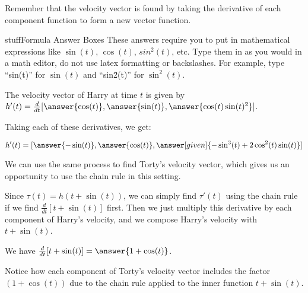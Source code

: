 \documentclass{ximera}
\begin{document}
\begin{problem}
    Remember that the velocity vector is found by taking the derivative of each component function to form a new vector function. 
    
    \begin{expandable}{stuff}{Formula Answer Boxes}
        These answers require you to put in mathematical expressions like $\sin(t)$, $\cos(t)$, $sin^2(t)$, etc. Type them in as you would in a math editor, do not use latex formatting or backslashes. For example, type ``sin(t)'' for $\sin(t)$ and ``sin\^2(t)'' for $\sin^2(t)$.
    \end{expandable}

    The velocity vector of Harry at time $t$ is given by $h'(t)=\frac{d}{dt}[ \answer{\cos(t)}, \answer{\sin(t)}, \answer{\cos(t) \sin(t)^2}]$.
    
    Taking each of these derivatives, we get:

    \[h'(t)=[ \answer{-\sin(t)}, \answer{\cos(t)}, \answer[given]{-\sin^3(t) + 2\cos^2(t) \sin(t)}]\]
\end{problem}

We can use the same process to find Torty's velocity vector, which gives us an opportunity to use the chain rule in this setting.

\begin{problem}
    Since $\tau(t)=h(t+\sin(t))$, we can simply find $\tau'(t)$ using the chain rule if we find $\frac{d}{dt}[t+\sin(t)]$ first. Then we just multiply this derivative by each component of Harry's velocity, and we compose Harry's velocity with $t+\sin(t)$.

    We have $\frac{d}{dt}[t+\sin(t)]=\answer{1+\cos(t)}$.
    
    \begin{feedback}
        Notice how each component of Torty's velocity vector includes the factor $(1+\cos(t))$ due to the chain rule applied to the inner function $t+\sin(t)$.
    \end{feedback}

\end{problem}
\end{document}
